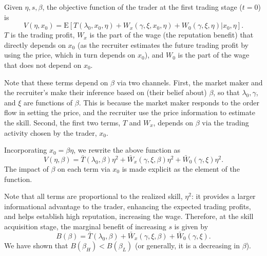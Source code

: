 
Given $\eta,s,\beta$, the objective function of the trader at the first trading stage ($t=0$) is 
\begin{equation}
V(\eta,x_{0}) = \mathrm{E}\left[T(\lambda_{0},x_{0},\eta) + W_{x}(\gamma,\xi,x_{0},\eta) + W_{0}(\gamma,\xi,\eta)|x_{0},\eta   \right].
\end{equation}
$T$ is the trading profit, $W_{x}$ is the part of the wage (the reputation benefit) that directly depends on $x_{0}$ (as the recruiter estimates the future trading profit by using the price, which in turn depends on $x_{0}$), and $W_{0}$ is the part of the wage that does not depend on $x_{0}$.

Note that these terms depend on $\beta$ via two channels. First, the market maker and the recruiter's make their inference based on (their belief about) $\beta$, so that $\lambda_{0}, \gamma$, and $\xi$ are functions of $\beta$. This is because the market maker responds to the order flow in setting the price, and the recruiter use the price information to estimate the skill. Second, the first two terms, $T$ and $W_{x}$, depends on $\beta$ via the trading activity chosen by the trader, $x_{0}$. 

Incorporating $x_{0} = \beta\eta$, we rewrite the above function as
\begin{equation}
V(\eta,\beta) = \bar{T}(\lambda_{0},\beta)\eta^2 + \bar{W}_{x}(\gamma,\xi,\beta)\eta^2 + \bar{W}_{0}(\gamma,\xi)\eta^2.
\end{equation}
The impact of $\beta$ on each term via $x_{0}$ is made explicit as the element of the function. 

Note that all terms are proportional to the realized skill, $\eta^2$: it provides a larger informational advantage to the trader, enhancing the expected trading profits, and helps establish high reputation, increasing the wage. Therefore, at the skill acquisition stage, the marginal benefit of increasing $s$ is given by 
\begin{equation}
B(\beta) = \bar{T}(\lambda_{0},\beta) + \bar{W}_{x}(\gamma,\xi,\beta) + \bar{W}_{0}(\gamma,\xi).
\end{equation}
We have shown that $B(\beta_{H})<B(\beta_{L})$ (or generally, it is a decreasing in $\beta$). 

